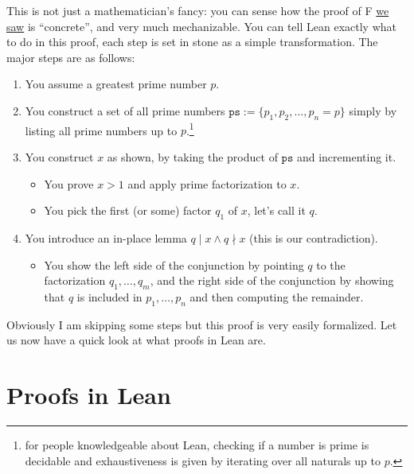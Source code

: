 \documentclass{article}
\begin{document}
This is not just a mathematician's fancy: you can sense how the proof of F \protect\hyperlink{easyproof}{we saw} is ``concrete'', and very much mechanizable.
You can tell Lean exactly what to do in this proof, each step is set in stone as a simple transformation.
The major steps are as follows:
\begin{enumerate}
\item You assume a greatest prime number $p$.
\item You construct a set of all prime numbers $\texttt{ps} := \{p_1, p_2, \ldots, p_n = p\}$ simply by listing all prime numbers up to $p$.\footnote{for people knowledgeable about Lean, checking if a number is prime is decidable and exhaustiveness is given by iterating over all naturals up to $p$.}
\item You construct $x$ as shown, by taking the product of $\texttt{ps}$ and incrementing it.
\begin{itemize}
\item You prove $x > 1$ and apply prime factorization to $x$.
\item You pick the first (or some) factor $q_1$ of $x$, let's call it $q$.
\end{itemize}
\item You introduce an in-place lemma $q \mid x \land q \nmid x$ (this is our contradiction).
\begin{itemize}
\item You show the left side of the conjunction by pointing $q$ to the factorization $q_1, \ldots, q_m$, and the right side of the conjunction by showing that $q$ is included in $p_1, \ldots, p_n$ and then computing the remainder.
\end{itemize}
\end{enumerate}

Obviously I am skipping some steps but this proof is very easily formalized.
Let us now have a quick look at what proofs in Lean are.

\section{Proofs in Lean}
\end{document}
